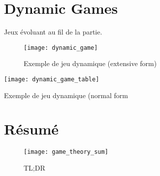 \section{Dynamic Games}

Jeux évoluant au fil de la partie.

\begin{figure}[H]
    \centering
    \texttt{[image: dynamic\_game]}
    \caption{Exemple de jeu dynamique (extensive form)}
\end{figure}

\begin{table}[H]
    \centering
    \texttt{[image: dynamic\_game\_table]}
    \caption{Exemple de jeu dynamique (normal form}
\end{table}

\section{Résumé}

\begin{figure}[H]
    \centering
    \texttt{[image: game\_theory\_sum]}
    \caption{TL;DR}
\end{figure}

